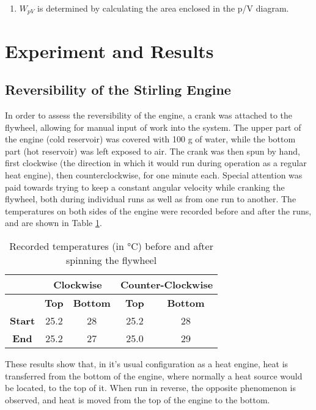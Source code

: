 \documentclass[titlepage]{article}
\begin{document}
\begin{enumerate}
    \item \(W_{pV}\) is determined by calculating the area enclosed in the p/V diagram.
\end{enumerate}


\newpage
\section{Experiment and Results}

\subsection{Reversibility of the Stirling Engine}
In order to assess the reversibility of the engine, a crank was attached to the flywheel, allowing for manual input of work into the system. The upper part of the engine (cold reservoir) was covered with 100 g of water, while the bottom part (hot reservoir) was left exposed to air.
The crank was then spun by hand, first clockwise (the direction in which it would run during operation as a regular heat engine), then counterclockwise, for one minute each. Special attention was paid towards trying to keep a constant angular velocity while cranking the flywheel, both during individual runs as well as from one run to another.
The temperatures on both sides of the engine were recorded before and after the runs, and are shown in Table \ref{tb_manual_temps}.

\begin{table}[H]
\centering
\begin{tabular}{|c|c|c|c|c|}
    \hline
    & \multicolumn{2}{|c|}{\textbf{Clockwise}} & \multicolumn{2}{|c|}{\textbf{Counter-Clockwise}}
    \\
    \hline
    & \textbf{Top} & \textbf{Bottom} & \textbf{Top} & \textbf{Bottom}
    \\
    \hline
    \textbf{Start} & 25.2 & 28 & 25.2 & 28
    \\
    \hline
    \textbf{End} & 25.2 & 27 & 25.0 & 29
    \\
    \hline
\end{tabular}
\caption{Recorded temperatures (in °C) before and after spinning the flywheel}
\label{tb_manual_temps}
\end{table}
%
\noindent These results show that, in it's usual configuration as a heat engine, heat is transferred from the bottom of the engine, where normally a heat source would be located, to the top of it. When run in reverse, the opposite phenomenon is observed, and heat is moved from the top of the engine to the bottom.
\end{document}

